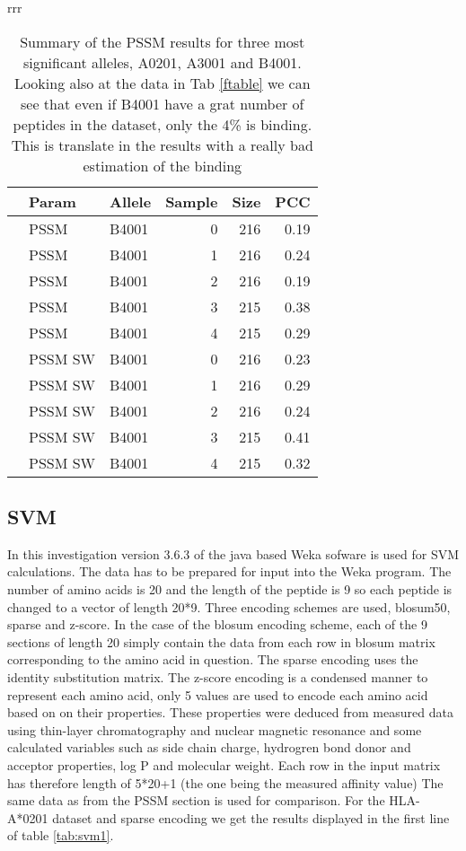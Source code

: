\begin{table*}
\begin{center}
\begin{tabular}{rrr}
\begin{tabular}{rllrrr}
  \hline
 & Param & Allele & Sample & Size & PCC \\ 
  \hline
   & PSSM & B4001 &   0 & 216 & 0.19 \\ 
   & PSSM & B4001 &   1 & 216 & 0.24 \\ 
   & PSSM & B4001 &   2 & 216 & 0.19 \\ 
   & PSSM & B4001 &   3 & 215 & 0.38 \\ 
   & PSSM & B4001 &   4 & 215 & 0.29 \\ 
\hline
   & PSSM SW & B4001 &   0 & 216 & 0.23 \\ 
   & PSSM SW & B4001 &   1 & 216 & 0.29 \\ 
   & PSSM SW & B4001 &   2 & 216 & 0.24 \\ 
   & PSSM SW & B4001 &   3 & 215 & 0.41 \\ 
   & PSSM SW & B4001 &   4 & 215 & 0.32 \\ 
   \hline
\end{tabular}

\end{tabular}
\end{center}
\caption{Summary of the PSSM results for three most significant alleles, A0201, A3001 and B4001. Looking also at the data in Tab \ref{ftable} we can see that even if B4001 have a grat number of peptides in the dataset, only the 4\% is binding. This is translate in the results with a really bad estimation of the binding}\label{tab:pssm1}
\end{table*}

\subsection*{SVM}
In this investigation version 3.6.3 of the java based Weka sofware is used for SVM calculations.
The data has to be prepared for input into the Weka program.
The number of amino acids is 20 and the length of the peptide is 9 so each peptide is changed to a vector of length 20*9. 
Three encoding schemes are used, blosum50, sparse and z-score. 
In the case of the blosum encoding scheme, each of the 9 sections of length 20 simply contain the data from each row in blosum matrix corresponding to the amino acid in question.
The sparse encoding uses the identity substitution matrix. 
The z-score encoding is a condensed manner to represent each amino acid, only 5 values are used to encode each amino acid based on on their properties. 
These properties were deduced from measured data using thin-layer chromatography and nuclear magnetic resonance and some calculated variables 
such as side chain charge, hydrogren bond donor and acceptor properties, log P and molecular weight. 
Each row in the input matrix has therefore length of 5*20+1 (the one being the measured affinity value)
The same data as from the PSSM section is used for comparison. For the HLA-A*0201 dataset and sparse encoding we get the results displayed in the first line of table \ref{tab:svm1}.

